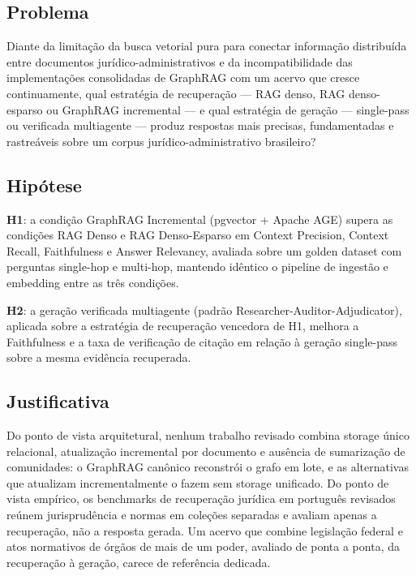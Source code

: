 \subsection{Problema}

Diante da limitação da busca vetorial pura para conectar informação
distribuída entre documentos jurídico-administrativos e da incompatibilidade
das implementações consolidadas de GraphRAG com um acervo que cresce
continuamente, qual estratégia de recuperação --- RAG denso, RAG
denso-esparso ou GraphRAG incremental --- e qual estratégia de geração ---
single-pass ou verificada multiagente --- produz respostas mais precisas,
fundamentadas e rastreáveis sobre um corpus jurídico-administrativo
brasileiro?

\subsection{Hipótese}

\textbf{H1}: a condição GraphRAG Incremental (pgvector + Apache AGE) supera
as condições RAG Denso e RAG Denso-Esparso em Context Precision, Context
Recall, Faithfulness e Answer Relevancy, avaliada sobre um golden dataset com
perguntas single-hop e multi-hop, mantendo idêntico o pipeline de ingestão e
embedding entre as três condições.

\textbf{H2}: a geração verificada multiagente (padrão
Researcher-Auditor-Adjudicator), aplicada sobre a estratégia de recuperação
vencedora de H1, melhora a Faithfulness e a taxa de verificação de citação em
relação à geração single-pass sobre a mesma evidência recuperada.

\subsection{Justificativa}

Do ponto de vista arquitetural, nenhum trabalho revisado combina storage
único relacional, atualização incremental por documento e ausência de
sumarização de comunidades: o GraphRAG canônico \parencite{edge2024}
reconstrói o grafo em lote, e as alternativas que atualizam incrementalmente
o fazem sem storage unificado. Do ponto de vista empírico, os benchmarks de
recuperação jurídica em português revisados reúnem jurisprudência e normas em
coleções separadas e avaliam apenas a recuperação, não a resposta gerada. Um
acervo que combine legislação federal e atos normativos de órgãos de mais de
um poder, avaliado de ponta a ponta, da recuperação à geração, carece de
referência dedicada.
